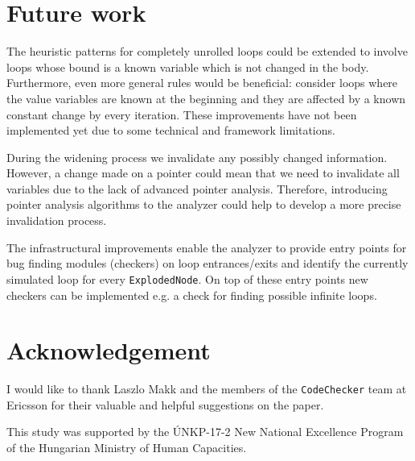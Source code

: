 \documentclass[oneside, a4paper, 12pt]{article}
\theoremstyle{definition}
\begin{document}
\section{Future work}
The heuristic patterns for completely unrolled loops could be extended to 
involve loops whose bound is a known variable which is not changed in the body. 
Furthermore, even more general rules would be beneficial: consider loops where  
the value variables are known at the beginning and they are affected by a known 
constant change by every iteration. These improvements have not been implemented
yet due to some technical and framework limitations.

During the widening process we invalidate any possibly changed information. 
However, a change made on a pointer could mean that we need to 
invalidate all variables due to the lack of advanced pointer analysis. Therefore, 
introducing pointer analysis algorithms to the analyzer could help to develop a 
more precise invalidation process.

The infrastructural improvements enable the analyzer to provide entry points 
for bug finding modules (checkers) on loop entrances/exits and identify the 
currently simulated loop for every \texttt{ExplodedNode}. On top of these entry 
points new checkers can be implemented e.g. a check for finding possible 
infinite loops.

\section{Acknowledgement}
I would like to thank Laszlo Makk and the members of the \texttt{CodeChecker} 
team at Ericsson for their valuable and helpful suggestions on the paper. 

This study was supported by the \'UNKP-17-2 New National Excellence Program of the Hungarian Ministry of Human Capacities.


%



\end{document}
